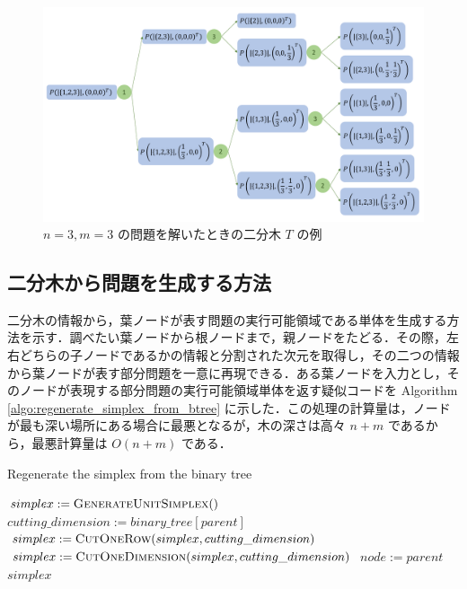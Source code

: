 \documentclass[a4paper,11pt]{jreport}
\begin{document}
\begin{figure}
\begin{center}
\includegraphics[width=17cm]{graphs/simplex_tree.pdf}
\caption{$ n = 3, m = 3 $ の問題を解いたときの二分木 $ T $ の例}
\label{fig:simplex_tree}
\end{center}
\end{figure}

\subsection{二分木から問題を生成する方法} \label{sec:generate_problem_from_btree}

二分木の情報から，葉ノードが表す問題の実行可能領域である単体を生成する方法を示す．調べたい葉ノードから根ノードまで，親ノードをたどる．その際，左右どちらの子ノードであるかの情報と分割された次元を取得し，その二つの情報から葉ノードが表す部分問題を一意に再現できる．ある葉ノードを入力とし，そのノードが表現する部分問題の実行可能領域単体を返す疑似コードを Algorithm \ref{algo:regenerate_simplex_from_btree} に示した．この処理の計算量は，ノードが最も深い場所にある場合に最悪となるが，木の深さは高々 $ n + m $ であるから，最悪計算量は $ O(n + m) $ である．\par

\begin{algorithm}
\caption{Regenerate the simplex from the binary tree}
\label{algo:regenerate_simplex_from_btree}
\begin{algorithmic}[1]
\State $ simplex := \Call{GenerateUnitSimplex} $
\State $ cutting\_dimension := binary\_tree[parent] $
\State $ simplex := \Call{CutOneRow}{simplex, cutting\_dimension} $
\State $ simplex := \Call{CutOneDimension}{simplex,  cutting\_dimension} $
\EndIf
\State $ node := parent $
\EndWhile
\State \Return $ simplex $
\EndFunction
\end{algorithmic}
\end{algorithm}
\end{document}
